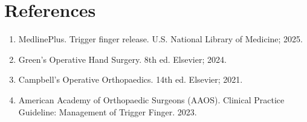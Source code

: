 \section*{References}
\begin{enumerate}
  \item MedlinePlus. Trigger finger release. U.S. National Library of Medicine; 2025.
  
  \item Green's Operative Hand Surgery. 8th ed. Elsevier; 2024.
  
  \item Campbell's Operative Orthopaedics. 14th ed. Elsevier; 2021.
  
  \item American Academy of Orthopaedic Surgeons (AAOS). Clinical Practice Guideline: Management of Trigger Finger. 2023.
\end{enumerate}

\clearpage
